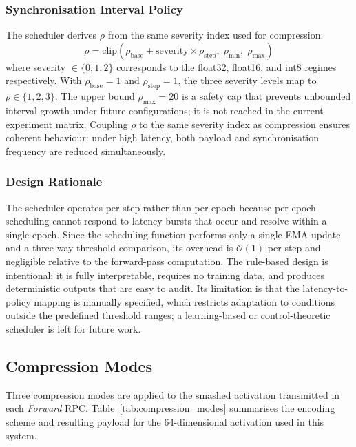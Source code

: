 \documentclass[conference]{IEEEtran}
\begin{document}
\subsubsection{Synchronisation Interval Policy}
The scheduler derives $\rho$ from the same severity index used for
compression:
\begin{equation}
    \rho = \mathrm{clip}\!\left(
        \rho_{\text{base}} + \text{severity} \times \rho_{\text{step}},\;
        \rho_{\text{min}},\;
        \rho_{\text{max}}
    \right)
    \label{eq:rho_policy}
\end{equation}
where severity $\in \{0,1,2\}$ corresponds to the float32, float16, and int8 regimes respectively. With $\rho_{\text{base}}=1$ and $\rho_{\text{step}}=1$, the three severity levels map to $\rho \in \{1, 2, 3\}$. The upper bound $\rho_{\text{max}}=20$ is a safety cap that prevents unbounded interval growth under future configurations; it is not reached in the current experiment matrix. Coupling $\rho$ to the same severity index as compression ensures coherent behaviour: under high latency, both payload and synchronisation frequency are reduced simultaneously.

\subsubsection{Design Rationale}
The scheduler operates per-step rather than per-epoch because per-epoch scheduling cannot respond to latency bursts that occur and resolve within a single epoch. Since the scheduling function performs only a single EMA update and a three-way threshold comparison, its overhead is $\mathcal{O}(1)$ per step and negligible relative to the forward-pass computation. The rule-based design is intentional: it is fully interpretable, requires no training data, and produces deterministic outputs that are easy to audit. Its limitation is that the latency-to-policy mapping is manually specified, which restricts adaptation to conditions outside the predefined threshold ranges; a learning-based or control-theoretic scheduler is left for future work.

\subsection{Compression Modes}
\label{subsec:compression}

Three compression modes are applied to the smashed activation transmitted in each \textit{Forward} RPC. Table~\ref{tab:compression_modes} summarises the encoding scheme and resulting payload for the 64-dimensional activation used in this system.
\end{document}
